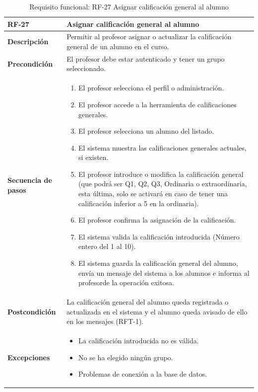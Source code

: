 \begin{table}[H]
\centering
\begin{tabularx}{\textwidth}{
  |>{\centering\arraybackslash}l
  |>{\centering\arraybackslash}X|}
\hline
\textbf{RF-27} & \textbf{Asignar calificación general al alumno} \\ \hline

\textbf{Descripción} & Permitir al profesor asignar o actualizar la calificación general de un alumno en el curso. \\ \hline

\textbf{Precondición} & El profesor debe estar autenticado y tener un grupo seleccionado. \\ \hline

\textbf{Secuencia de pasos} &
\begin{enumerate}
  \item El profesor selecciona el perfil o administración.
  \item El profesor accede a la herramienta de calificaciones generales.
  \item El profesor selecciona un alumno del listado.
  \item El sistema muestra las calificaciones generales actuales, si existen.
  \item El profesor introduce o modifica la calificación general (que podrá ser Q1, Q2, Q3, Ordinaria o extraordinaria, esta última, solo se activará en caso de tener una calificación inferior a 5 en la ordinaria).
  \item El profesor confirma la asignación de la calificación.
  \item El sistema valida la calificación introducida (Número entero del 1 al 10).
  \item El sistema guarda la calificación general del alumno, envía un mensaje del sistema a los alumnos e informa al profesorde la operación exitosa.
\end{enumerate} \\ \hline

\textbf{Postcondición} & La calificación general del alumno queda registrada o actualizada en el sistema y el alumno queda avisado de ello en los mensajes (RFT-1). \\ \hline

\textbf{Excepciones} &
\begin{itemize}
  \item La calificación introducida no es válida.
  \item No se ha elegido ningún grupo.
  \item Problemas de conexión a la base de datos.
\end{itemize} \\ \hline
\end{tabularx}
\caption{Requisito funcional: RF-27 Asignar calificación general al alumno}
\label{tab:RF-27}
\end{table}

